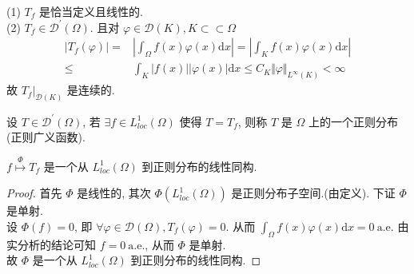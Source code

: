 \documentclass[11pt]{ctexart}[UTF8]
\begin{document}
\begin{proposition}\leavevmode\\
    (1) $T_{f}$ 是恰当定义且线性的.\\
    (2) $T_{f} \in \mathscr{D}^{\prime}(\Omega)$. 且对 $\varphi \in \mathscr{D}(K),K \subset\subset \Omega$
    \begin{equation*}
        \begin{aligned}
            |T_{f}(\varphi)| = & \left| \int_{\Omega} f(x) \varphi(x) \mathrm{d}x \right| = \left| \int_{K} f(x) \varphi(x) \mathrm{d}x \right| \\
            \leq & \int_{K} |f(x)| |\varphi(x)| \mathrm{d}x \leq C_{K} \Vert \varphi \Vert_{L^{\infty}(K)} < \infty
        \end{aligned}
    \end{equation*}
    故 $T_{f}\big|_{\mathscr{D}(K)}$ 是连续的.
\end{proposition}
\begin{definition}
    设 $T \in \mathscr{D}^{\prime}(\Omega)$, 若 $\exists f \in L_{loc}^{1}(\Omega)$ 使得 $T = T_{f}$, 则称 $T$ 是 $\Omega$ 上的一个正则分布(正则广义函数).
\end{definition}
\begin{proposition}\leavevmode
    $f \overset{\Phi}{\longmapsto} T_f$ 是一个从 $L_{loc}^{1}(\Omega)$ 到正则分布的线性同构.
\end{proposition}
\begin{proof}
    首先 $\Phi$ 是线性的, 其次 $\Phi(L_{loc}^{1}(\Omega))$ 是正则分布子空间.(由定义). 下证 $\Phi$ 是单射. \\
    设 $\Phi(f) = 0$, 即 $\forall \varphi \in \mathscr{D}(\Omega), T_f(\varphi) = 0$. 从而 $\int_{\Omega} f(x) \varphi(x) \mathrm{d}x = 0 \ \mathrm{a.e.}$
    由实分析的结论可知 $f = 0 \ \mathrm{a.e.}$, 从而 $\Phi$ 是单射.\\
    故 $\Phi$ 是一个从 $L_{loc}^{1}(\Omega)$ 到正则分布的线性同构.
\end{proof}
\end{document}
